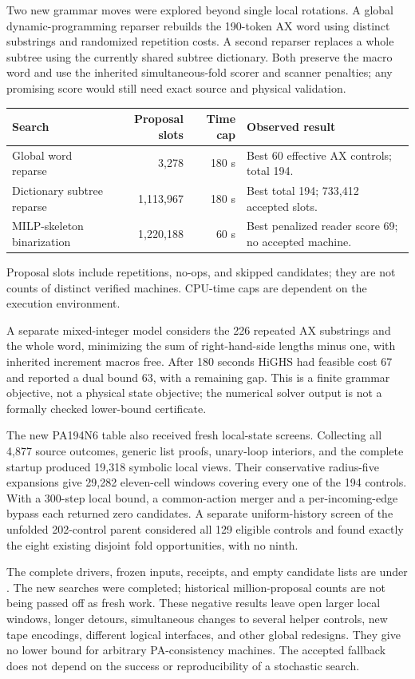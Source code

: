 Two new grammar moves were explored beyond
single local rotations. A global dynamic-programming reparser rebuilds the
190-token AX word using distinct substrings and randomized repetition costs.
A second reparser replaces a whole subtree using the currently shared
subtree dictionary. Both preserve the macro word and use the inherited
simultaneous-fold scorer and scanner penalties; any promising score would
still need exact source and physical validation.

\begin{center}\small
\begin{tabularx}{\linewidth}{@{}lrrX@{}}\toprule
Search & Proposal slots & Time cap & Observed result\\\midrule
Global word reparse & 3,278 & 180 s & Best 60 effective AX controls; total 194.\\
Dictionary subtree reparse & 1,113,967 & 180 s & Best total 194; 733,412 accepted slots.\\
MILP-skeleton binarization & 1,220,188 & 60 s & Best penalized reader score 69; no accepted machine.\\\bottomrule
\end{tabularx}
\end{center}
Proposal slots include repetitions, no-ops, and skipped candidates; they
are not counts of distinct verified machines. CPU-time caps are dependent
on the execution environment.

A separate mixed-integer model considers the 226 repeated AX substrings
and the whole word, minimizing the sum of right-hand-side lengths minus
one, with inherited increment macros free. After 180 seconds HiGHS had
feasible cost 67 and reported a dual bound 63, with a remaining gap.
This is a finite grammar objective, not a physical state objective; the
numerical solver output is not a formally checked lower-bound certificate.

The new PA194N6 table also received fresh local-state screens. Collecting
all 4,877 source outcomes, generic list proofs, unary-loop interiors, and
the complete startup produced 19,318 symbolic local views. Their conservative
radius-five expansions give 29,282 eleven-cell windows covering every one
of the 194 controls. With a 300-step local bound, a common-action merger
and a per-incoming-edge bypass each returned zero candidates. A separate
uniform-history screen of the unfolded 202-control parent considered all
129 eligible controls and found exactly the eight existing disjoint fold
opportunities, with no ninth.

The complete drivers, frozen inputs, receipts, and empty candidate lists
are under . The new searches were completed; historical
million-proposal counts are not being passed off as fresh work. These
negative results leave open larger local windows, longer detours,
simultaneous changes to several helper controls, new tape encodings,
different logical interfaces, and other global redesigns. They give no
lower bound for arbitrary PA-consistency machines. The accepted fallback
does not depend on the success or reproducibility of a stochastic search.
